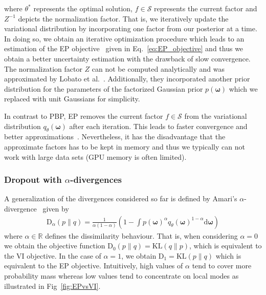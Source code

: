 \documentclass[runningheads]{llncs}
\begin{document}
where $\theta^*$ represents the optimal solution, $f \in \mathcal{S}$ represents the current factor and $Z^{-1}$ depicts the normalization factor.
That is, we iteratively update the variational distribution by incorporating one factor from our posterior at a time.
In doing so, we obtain an iterative optimization procedure which leads to an estimation of the EP objective~\cite{hernandez2015probabilistic} given in Eq.~\ref{eq:EP_objective} and thus we obtain a better uncertainty estimation with the drawback of slow convergence.
The normalization factor $Z$ can not be computed analytically and was approximated by Lobato et al.~\cite{hernandez2015probabilistic}.
Additionally, they incorporated another prior distribution for the parameters of the factorized Gaussian prior $p(\boldsymbol{\omega})$ which we replaced with unit Gaussians for simplicity.

In contrast to PBP, EP removes the current factor $f \in \mathcal{S}$ from the variational distribution $q_\theta(\boldsymbol{\omega})$ after each iteration.
This leads to faster convergence and better approximations~\cite{minka2001expectation}.
Nevertheless, it has the disadvantage that the approximate factors has to be kept in memory and thus we typically can not work with large data sets (GPU memory is often limited).

\subsubsection{Dropout with $\alpha$-divergences}
\label{sec:droput_alpha_divergence}
A generalization of the divergences considered so far is defined by Amari's $\alpha$-divergence~\cite{amari2012differential} given by
\begin{align}
    \mathrm{D}_{\alpha}(p \| q) = \frac{1}{\alpha(1 - \alpha)} \left(1 - \int p(\boldsymbol{\omega})^\alpha q_\theta(\boldsymbol{\omega})^{1 - \alpha} \mathrm{d}\boldsymbol{\omega}\right)\label{eq:alpha_divergence}
\end{align}
where $\alpha \in \mathbb{R}$ defines the dissimilarity behaviour.
That is, when considering $\alpha = 0$ we obtain the objective function $\mathrm{D}_0(p \| q) = \mathrm{KL}(q\|p)$, which is equivalent to the VI objective. 
In the case of $\alpha = 1$, we obtain $\mathrm{D}_1 = \mathrm{KL}(p\|q)$ which is equivalent to the EP objective.
Intuitively, high values of $\alpha$ tend to cover more probability mass whereas low values tend to concentrate on local modes as illustrated in Fig~\ref{fig:EPvsVI}.
\end{document}
